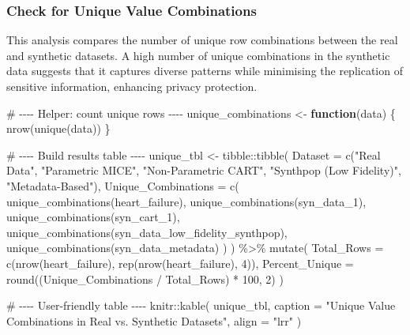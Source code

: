 \documentclass[
  letterpaper,
  DIV=11,
  numbers=noendperiod]{scrartcl}
\newenvironment{Shaded}{\begin{snugshade}}{\end{snugshade}}
\newcommand{\AttributeTok}[1]{\textcolor[rgb]{0.40,0.45,0.13}{#1}}
\newcommand{\CommentTok}[1]{\textcolor[rgb]{0.37,0.37,0.37}{#1}}
\newcommand{\ControlFlowTok}[1]{\textcolor[rgb]{0.00,0.23,0.31}{\textbf{#1}}}
\newcommand{\DecValTok}[1]{\textcolor[rgb]{0.68,0.00,0.00}{#1}}
\newcommand{\FunctionTok}[1]{\textcolor[rgb]{0.28,0.35,0.67}{#1}}
\newcommand{\NormalTok}[1]{\textcolor[rgb]{0.00,0.23,0.31}{#1}}
\newcommand{\OtherTok}[1]{\textcolor[rgb]{0.00,0.23,0.31}{#1}}
\newcommand{\SpecialCharTok}[1]{\textcolor[rgb]{0.37,0.37,0.37}{#1}}
\newcommand{\StringTok}[1]{\textcolor[rgb]{0.13,0.47,0.30}{#1}}
\begin{document}
\subsubsection{Check for Unique Value
Combinations}\label{check-for-unique-value-combinations}

This analysis compares the number of unique row combinations between the
real and synthetic datasets. A high number of unique combinations in the
synthetic data suggests that it captures diverse patterns while
minimising the replication of sensitive information, enhancing privacy
protection.

\begin{Shaded}
\begin{Highlighting}[]
\CommentTok{\# {-}{-}{-}{-} Helper: count unique rows {-}{-}{-}{-}}
\NormalTok{unique\_combinations }\OtherTok{\textless{}{-}} \ControlFlowTok{function}\NormalTok{(data) \{}
  \FunctionTok{nrow}\NormalTok{(}\FunctionTok{unique}\NormalTok{(data))}
\NormalTok{\}}

\CommentTok{\# {-}{-}{-}{-} Build results table {-}{-}{-}{-}}
\NormalTok{unique\_tbl }\OtherTok{\textless{}{-}}\NormalTok{ tibble}\SpecialCharTok{::}\FunctionTok{tibble}\NormalTok{(}
  \AttributeTok{Dataset =} \FunctionTok{c}\NormalTok{(}\StringTok{"Real Data"}\NormalTok{, }\StringTok{"Parametric MICE"}\NormalTok{, }
              \StringTok{"Non{-}Parametric CART"}\NormalTok{, }\StringTok{"Synthpop (Low Fidelity)"}\NormalTok{, }
              \StringTok{"Metadata{-}Based"}\NormalTok{),}
  \AttributeTok{Unique\_Combinations =} \FunctionTok{c}\NormalTok{(}
    \FunctionTok{unique\_combinations}\NormalTok{(heart\_failure),}
    \FunctionTok{unique\_combinations}\NormalTok{(syn\_data\_1),}
    \FunctionTok{unique\_combinations}\NormalTok{(syn\_cart\_1),}
    \FunctionTok{unique\_combinations}\NormalTok{(syn\_data\_low\_fidelity\_synthpop),}
    \FunctionTok{unique\_combinations}\NormalTok{(syn\_data\_metadata)}
\NormalTok{  )}
\NormalTok{) }\SpecialCharTok{\%\textgreater{}\%}
  \FunctionTok{mutate}\NormalTok{(}
    \AttributeTok{Total\_Rows =} \FunctionTok{c}\NormalTok{(}\FunctionTok{nrow}\NormalTok{(heart\_failure), }\FunctionTok{rep}\NormalTok{(}\FunctionTok{nrow}\NormalTok{(heart\_failure), }\DecValTok{4}\NormalTok{)),}
    \AttributeTok{Percent\_Unique =} \FunctionTok{round}\NormalTok{((Unique\_Combinations }\SpecialCharTok{/}\NormalTok{ Total\_Rows) }\SpecialCharTok{*} \DecValTok{100}\NormalTok{, }\DecValTok{2}\NormalTok{)}
\NormalTok{  )}

\CommentTok{\# {-}{-}{-}{-} User{-}friendly table {-}{-}{-}{-}}
\NormalTok{knitr}\SpecialCharTok{::}\FunctionTok{kable}\NormalTok{(}
\NormalTok{  unique\_tbl,}
  \AttributeTok{caption =} \StringTok{"Unique Value Combinations in Real vs. Synthetic Datasets"}\NormalTok{,}
  \AttributeTok{align =} \StringTok{"lrr"}
\NormalTok{)}
\end{Highlighting}
\end{Shaded}
\end{document}
